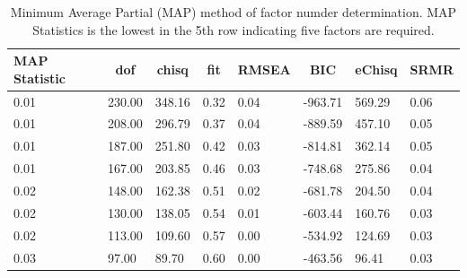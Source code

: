 \documentclass[
  man]{apa6}
\begin{document}
\begin{table}[tbp]

\begin{center}
\begin{threeparttable}

\caption{\label{tab:map-tab}Minimum Average Partial (MAP) method of factor numder determination. MAP Statistics is the lowest in the 5th row indicating five factors are required.}

\begin{tabular}{llllllll}
\toprule
MAP Statistic & \multicolumn{1}{c}{dof} & \multicolumn{1}{c}{chisq} & \multicolumn{1}{c}{fit} & \multicolumn{1}{c}{RMSEA} & \multicolumn{1}{c}{BIC} & \multicolumn{1}{c}{eChisq} & \multicolumn{1}{c}{SRMR}\\
\midrule
0.01 & 230.00 & 348.16 & 0.32 & 0.04 & -963.71 & 569.29 & 0.06\\
0.01 & 208.00 & 296.79 & 0.37 & 0.04 & -889.59 & 457.10 & 0.05\\
0.01 & 187.00 & 251.80 & 0.42 & 0.03 & -814.81 & 362.14 & 0.05\\
0.01 & 167.00 & 203.85 & 0.46 & 0.03 & -748.68 & 275.86 & 0.04\\
0.02 & 148.00 & 162.38 & 0.51 & 0.02 & -681.78 & 204.50 & 0.04\\
0.02 & 130.00 & 138.05 & 0.54 & 0.01 & -603.44 & 160.76 & 0.03\\
0.02 & 113.00 & 109.60 & 0.57 & 0.00 & -534.92 & 124.69 & 0.03\\
0.03 & 97.00 & 89.70 & 0.60 & 0.00 & -463.56 & 96.41 & 0.03\\
\bottomrule
\end{tabular}

\end{threeparttable}
\end{center}

\end{table}
\end{document}
